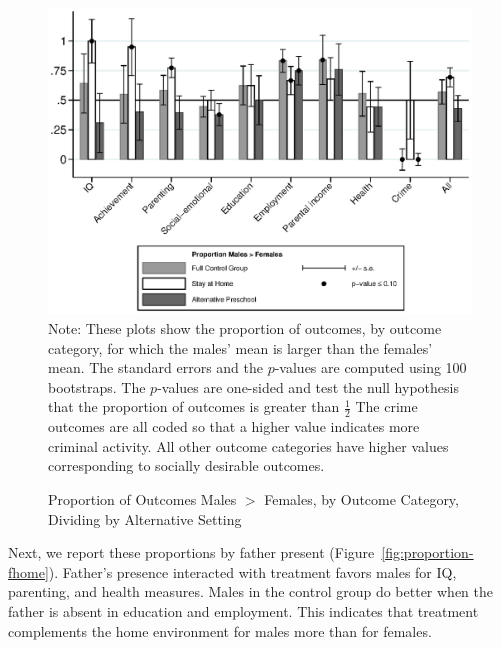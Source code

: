 \begin{figure}[H]
\centering
\caption{Proportion of Outcomes Males $>$ Females, by Outcome Category, Dividing by Alternative Setting}
\label{fig:proportion-altpre}
	\includegraphics[width=\textwidth]{output/gendergaps-control-moderated-altpre}
\footnotesize \justify
Note: These plots show the proportion of outcomes, by outcome category, for which the males' mean is larger than the females' mean. The standard errors and the $p$-values are computed using 100 bootstraps. The $p$-values are one-sided and test the null hypothesis that the proportion of outcomes is greater than $\frac{1}{2}$ The crime outcomes are all coded so that a higher value indicates more criminal activity. All other outcome categories have higher values corresponding to socially desirable outcomes. 
\end{figure}

Next, we report these proportions by father present (Figure~\ref{fig:proportion-fhome}). Father's presence interacted with treatment favors males for IQ, parenting, and health measures. Males in the control group do better when the father is absent in education and employment. This indicates that treatment complements the home environment for males more than for females. 

